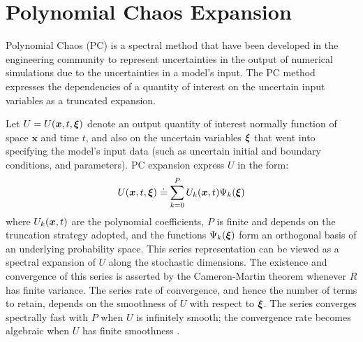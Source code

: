 \section{Polynomial Chaos Expansion}
\label{sec:uqpce}

Polynomial Chaos (PC) is a spectral method that have been developed in the engineering community to represent uncertainties in the output of numerical simulations \citep{Villegas2012,Lin2009,Xiu2004}
due to the uncertainties in a model's input.
The PC method expresses the dependencies of a quantity of 
interest on the uncertain input variables as a truncated expansion. 

Let $U=U(\bm{x},t,\xxi)$ 
denote an output quantity of 
interest normally function of space $\bm{x}$ and time $t$, and also on the uncertain variables $\xxi$ that went into
specifying the model's input data (such as uncertain initial and boundary conditions, and parameters). PC expansion express $U$ in the form:
\begin{equation}
  U(\xbold,t,\xxi) \doteq \sum_{k = 0}^P U_k(\xbold,t) \Psi_k(\xxi)
\label{eq:stochseries}
\end{equation}
where $U_k(\xbold,t)$ are the polynomial coefficients, $P$ is finite
and depends on the truncation strategy adopted, and the functions
$\Psi_k(\xxi)$ form an orthogonal basis of an underlying probability
space. This series representation can be viewed as a spectral expansion
of $U$ along the stochastic dimensions.  The existence and convergence of this series
is asserted by the Cameron-Martin theorem
\citep{Cameron:1947}  whenever $R$ has finite variance. The series rate of convergence, and
hence the number of terms to retain, depends on the smoothness of
$U$ with respect to $\xxi$. The series converges spectrally fast with $P$
when $U$ is infinitely smooth; the convergence rate becomes algebraic
when $U$ has finite smoothness \citep{Canuto:2006}. 

